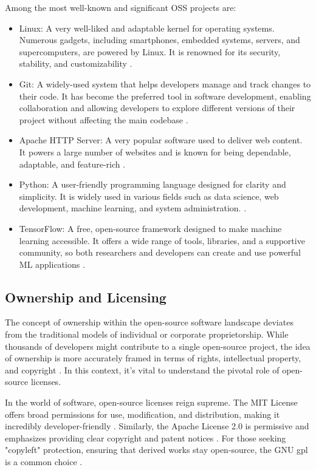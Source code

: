 Among the most well-known and significant OSS projects are:
\begin{itemize}
    \item Linux: A very well-liked and adaptable kernel for operating systems. Numerous gadgets, including smartphones, embedded systems, servers, and supercomputers, are powered by Linux. It is renowned for its security, stability, and customizability \citep{fink2003business}.
    \item Git: A widely-used system that helps developers manage and track changes to their code. It has become the preferred tool in software development, enabling collaboration and allowing developers to explore different versions of their project without affecting the main codebase \citep{loeliger2012version}.
    \item Apache HTTP Server: A very popular software used to deliver web content. It powers a large number of websites and is known for being dependable, adaptable, and feature-rich \citep{fielding1997apache}.
    \item  Python: A user-friendly programming language designed for clarity and simplicity. It is widely used in various fields such as data science, web development, machine learning, and system administration. \citep{srinath2017python}.
    \item TensorFlow: A free, open-source framework designed to make machine learning accessible. It offers a wide range of tools, libraries, and a supportive community, so both researchers and developers can create and use powerful ML applications \citep{developers2022tensorflow}.
\end{itemize}

\subsection{Ownership and Licensing}

The concept of ownership within the open-source software landscape deviates from the traditional models of individual or corporate proprietorship. While thousands of developers might contribute to a single open-source project, the idea of ownership is more accurately framed in terms of rights, intellectual property, and copyright \citep{Codeownership}.  In this context, it's vital to understand the pivotal role of open-source licenses.

In the world of software, open-source licenses reign supreme. The MIT License offers broad permissions for use, modification, and distribution, making it incredibly developer-friendly \citep{saltzer2020origin}. Similarly, the Apache License 2.0 is permissive and emphasizes providing clear copyright and patent notices \citep{sinclair2010license}. For those seeking "copyleft" protection, ensuring that derived works stay open-source, the GNU \ac{gpl} is a common choice \citep{license1989gnu}.

